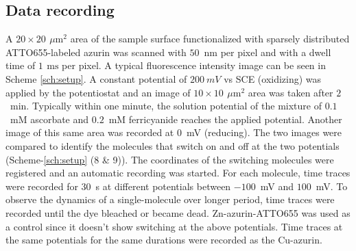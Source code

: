 \documentclass[journal=jacsat,manuscript=article]{achemso}
\newcommand{\um}{\ensuremath{\,\mu\textrm{m}}}
\newcommand{\ms}{\ensuremath{\,\textrm{ms}}}
\begin{document}
\subsection{Data recording}
A $20\times20~\um^2$ area of the sample surface functionalized with sparsely distributed ATTO655-labeled azurin was scanned with $50$~nm per pixel and with a dwell time of $1~\ms$ per pixel. A typical fluorescence intensity image can be seen in Scheme \ref{sch:setup}. A constant potential of $200~mV$ vs SCE (oxidizing) was applied by the potentiostat and an image of $10\times10~\um^2$ area was taken after $2$~min. Typically within one minute, the solution potential of the mixture of $0.1$~mM ascorbate and $0.2$~mM ferricyanide reaches the applied potential. Another image of this same area was recorded at $0$~mV (reducing). The two images were compared to identify the molecules that switch on and off at the two potentials (Scheme-\ref{sch:setup} (8 \& 9)). The coordinates of the switching molecules were registered and an automatic recording was started. For each molecule, time traces were recorded for $30$~s at different potentials between $-100$~mV and $100$~mV. To observe the dynamics of a single-molecule over longer period, time traces were recorded until the dye  bleached or became dead. Zn-azurin-ATTO655 was used as a control since it doesn't show switching at the above potentials. Time traces at the same potentials for the same durations were recorded as the Cu-azurin.
\end{document}
